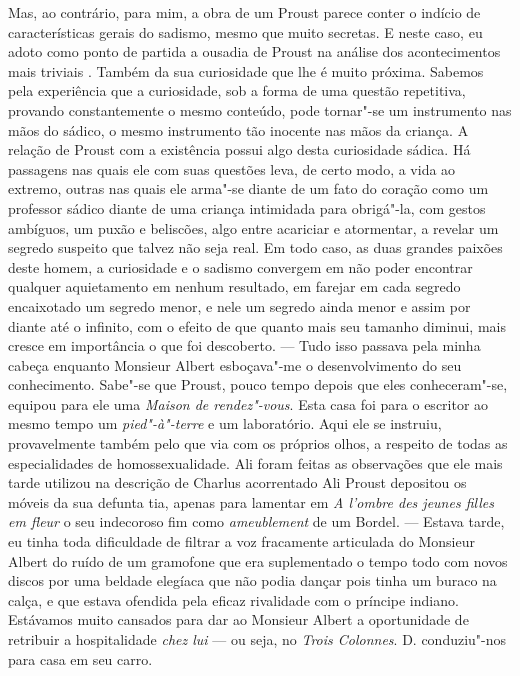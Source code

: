 Mas, ao contrário, para mim, a obra de um Proust parece conter o indício
de características gerais do sadismo, mesmo que muito secretas. E neste
caso, eu adoto como ponto de partida a ousadia de Proust na análise dos
acontecimentos mais triviais . Também da sua curiosidade que lhe é muito
próxima. Sabemos pela experiência que a curiosidade, sob a forma de uma
questão repetitiva, provando constantemente o mesmo conteúdo, pode
tornar"-se um instrumento nas mãos do sádico, o mesmo instrumento tão
inocente nas mãos da criança. A relação de Proust com a existência
possui algo desta curiosidade sádica. Há passagens nas quais ele com
suas questões leva, de certo modo, a vida ao extremo, outras nas quais
ele arma"-se diante de um fato do coração como um professor sádico diante
de uma criança intimidada para obrigá"-la, com gestos ambíguos, um puxão
e beliscões, algo entre acariciar e atormentar, a revelar um segredo
suspeito que talvez não seja real. Em todo caso, as duas grandes paixões
deste homem, a curiosidade e o sadismo convergem em não poder encontrar
qualquer aquietamento em nenhum resultado, em farejar em cada segredo
encaixotado um segredo menor, e nele um segredo ainda menor e assim por
diante até o infinito, com o efeito de que quanto mais seu tamanho
diminui, mais cresce em importância o que foi descoberto. --- Tudo isso
passava pela minha cabeça enquanto Monsieur Albert esboçava"-me o
desenvolvimento do seu conhecimento. Sabe"-se que Proust, pouco tempo
depois que eles conheceram"-se, equipou para ele uma \emph{Maison de
rendez"-vous}. Esta casa foi para o escritor ao mesmo tempo um
\emph{pied"-à"-terre} e um laboratório. Aqui ele se instruiu,
provavelmente também pelo que via com os próprios olhos, a respeito de
todas as especialidades de homossexualidade. Ali foram feitas as
observações que ele mais tarde utilizou na descrição de Charlus
acorrentado Ali Proust depositou os móveis da sua defunta tia, apenas
para lamentar em \emph{A l'ombre des jeunes filles em fleur} o seu
indecoroso fim como \emph{ameublement} de um Bordel. --- Estava tarde, eu
tinha toda dificuldade de filtrar a voz fracamente articulada do
Monsieur Albert do ruído de um gramofone que era suplementado o tempo
todo com novos discos por uma beldade elegíaca que não podia dançar pois
tinha um buraco na calça, e que estava ofendida pela eficaz rivalidade
com o príncipe indiano. Estávamos muito cansados para dar ao Monsieur
Albert a oportunidade de retribuir a hospitalidade \emph{chez lui} --- ou
seja, no \emph{Trois Colonnes}. D. conduziu"-nos para casa em seu carro.

